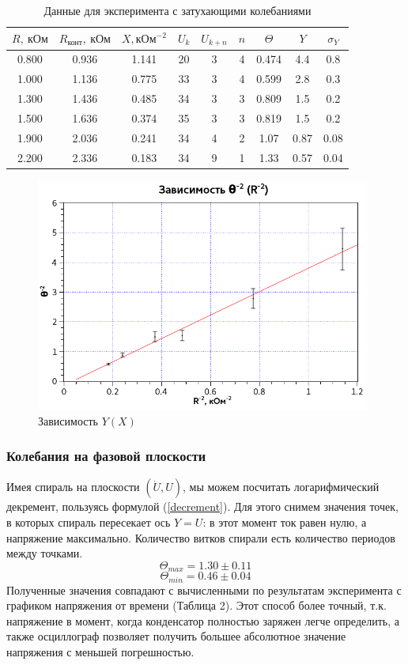 \documentclass{article}
\begin{document}
   \begin{table}[h] 
   \label{e2tab}
   \centering
   \caption{Данные для эксперимента с затухающими колебаниями}
   \begin{tabular}{|*{9}{c|}}
   \hline 
   $R,~ \text{кОм}$ & $R_{\text{конт}},~ \text{кОм}$ & $ X, \text{кОм}^{-2}$ & 
   $U_k$ & $U_{k+n}$ & $n$ & $\Theta$ & $Y$ & $\sigma_Y$ \\ \hline 
   0.800 & 0.936 & 1.141 & 20 & 3 & 4 & 0.474 & 4.4 & 0.8 \\ \hline 
   1.000 & 1.136 & 0.775 & 33 & 3 & 4 & 0.599 & 2.8 & 0.3 \\ \hline 
   1.300 & 1.436 & 0.485 & 34 & 3 & 3 & 0.809 & 1.5 & 0.2 \\ \hline 
   1.500 & 1.636 & 0.374 & 35 & 3 & 3 & 0.819 & 1.5 & 0.2 \\ \hline 
   1.900 & 2.036 & 0.241 & 34 & 4 & 2 & 1.07 & 0.87 & 0.08 \\ \hline 
   2.200 & 2.336 & 0.183 & 34 & 9 & 1 & 1.33 & 0.57 & 0.04 \\ \hline 
   \end{tabular} 
   \end{table} 
   
   \begin{figure}[h]
   \centering
   \includegraphics[width=11cm]{fig2.png} 
   \caption{Зависимость $Y(X)$} 
   \label{fig.2} 
   \end{figure}
   
   \subsubsection*{Колебания на фазовой плоскости}
   Имея спираль на плоскости $(\dot U, U)$, мы можем посчитать логарифмический декремент, пользуясь формулой (\ref{decrement}). Для этого снимем значения точек, в которых спираль пересекает ось $Y = U$: в этот момент ток равен нулю, а напряжение максимально. Количество витков спирали есть количество периодов между точками.
   $$ \Theta_{max} =  1.30 \pm 0.11 $$
   $$ \Theta_{min} = 0.46 \pm 0.04 $$
   Полученные значения совпадают с вычисленными по результатам эксперимента с графиком напряжения от времени (Таблица 2). Этот способ более точный, т.к. напряжение в момент, когда конденсатор полностью заряжен легче определить, а также осциллограф позволяет получить большее абсолютное значение напряжения с меньшей погрешностью.
   
\end{document}
